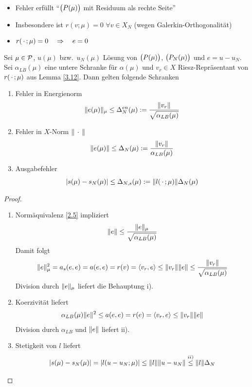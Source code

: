 \begin{bem} \beginwithlistbem
	\begin{itemize}
		\item Fehler erfüllt ``$\big(P(\mu)\big)$ mit Residuum als rechte Seite''
		\item Insbesondere ist $r(v;\mu) = 0$ $\forall v \in X_N$ (wegen Galerkin-Orthogonalität)
		\item $r(\,\cdot\,;\mu) = 0 \quad \Rightarrow \quad e = 0$
	\end{itemize}
\end{bem}

\begin{satz} \label{3.13}
	Sei $\mu \in \mathcal{P}$, $u(\mu)$ bzw.\ $u_N(\mu)$ Lösung von $\big(P(\mu)\big)$, $\big(P_N(\mu)\big)$ und $e=u-u_N$.
	Sei $\alpha_{LB}(\mu)$ eine untere Schranke für $\alpha(\mu)$ und $v_r \in X$ Riesz-Repräsentant von $r(\,\cdot\,;\mu)$ aus Lemma \ref{3.12}.
	Dann gelten folgende Schranken
	\begin{enumerate}
		\item Fehler in Energienorm
			\[
				\|e(\mu)\|_\mu \leq \Delta_N^{en}(\mu) := \frac{\|v_r\|}{\sqrt{\alpha_{LB}(\mu)}}
			\]
		\item Fehler in $X$-Norm $\|\,\cdot\,\|$
			\[
				\|e(\mu)\| \leq \Delta_N(\mu) := \frac{\|v_r\|}{\alpha_{LB}(\mu)}
			\]
		\item Ausgabefehler
			\[
				|s(\mu)-s_N(\mu)| \leq \Delta_{N,s}(\mu) := \|l(\,\cdot\,;\mu)\| \Delta_N(\mu)
			\]
	\end{enumerate}

	\begin{proof} \beginwithlistbew
		\begin{enumerate}
			\item Normäquivalenz \ref{2.5} impliziert
				\[
					\|e\| \leq \frac{\|e\|_\mu}{\sqrt{\alpha_{LB}(\mu)}}
				\]
				Damit folgt
				\[
					\|e\|_\mu^2 = a_s(e,e) = a(e,e) = r(v) = \langle v_r, e \rangle \leq \|v_r\| \|e\| \leq \frac{\|v_r\|}{\sqrt{\alpha_{LB}(\mu)}}
				\]
				Division durch $\|e\|_\mu$ liefert die Behauptung i).
			\item Koerzivität liefert
				\[
					\alpha_{LB}(\mu) \|e\|^2 \leq a(e,e) = r(e) = \langle v_r, e \rangle \leq \|v_r\| \|e\|
				\]
				Division durch $\alpha_{LB}$ und $\|e\|$ liefert ii).
			\item Stetigkeit von $l$ liefert
				\[
					|s(\mu)-s_N(\mu)| = |l(u-u_N;\mu)| \leq \|l\| \|u-u_N\| \stackrel{ii)}{\leq} \|l\| \Delta_N
				\]
		\end{enumerate}
	\end{proof}
\end{satz}


